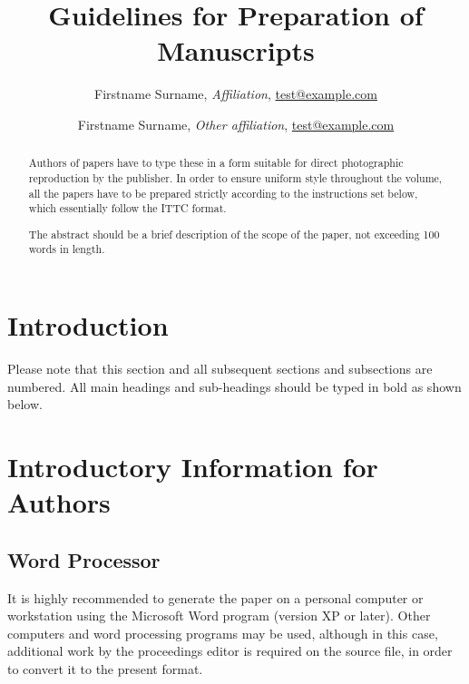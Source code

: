 \documentclass{stabs2021}
\begin{document}
\title{Guidelines for Preparation of Manuscripts}

\author{
  Firstname Surname, \textit{Affiliation},
  \href{mailto:test@example.com}{test@example.com}
  \and
  Firstname Surname, \textit{Other affiliation},
  \href{mailto:test@example.com}{test@example.com}
}

\begin{frontmatter}
  \maketitle

  \begin{abstract}
    Authors of papers have to type these in a form suitable for direct
    photographic reproduction by the publisher. In order to ensure
    uniform style throughout the volume, all the papers have to be
    prepared strictly according to the instructions set below, which
    essentially follow the ITTC format.

    The abstract should be a brief description of the scope of the
    paper, not exceeding 100 words in length.
  \end{abstract}

\end{frontmatter}

\section{Introduction}

Please note that this section and all subsequent sections and
subsections are numbered.  All main headings and sub-headings should
be typed in bold as shown below.

\section{Introductory Information for Authors}

\subsection{Word Processor}

It is highly recommended to generate the paper on a personal computer
or workstation using the Microsoft Word program (version XP or
later). Other computers and word processing programs may be used,
although in this case, additional work by the proceedings editor is
required on the source file, in order to convert it to the present
format.
\end{document}
